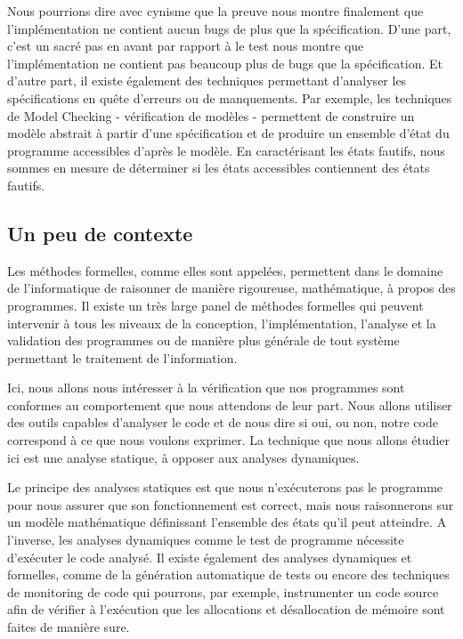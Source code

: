 \documentclass[12pt,francais,]{scrbook}
\begin{document}
Nous pourrions dire avec cynisme que la preuve nous montre finalement
que l'implémentation \og{}ne contient aucun bugs de plus que la
spécification\fg{}. D'une part, c'est un sacré pas en avant par rapport à
\og{}le test nous montre que l'implémentation ne contient pas beaucoup plus
de bugs que la spécification\fg{}. Et d'autre part, il existe également des
techniques permettant d'analyser les spécifications en quête d'erreurs
ou de manquements. Par exemple, les techniques de Model Checking -
vérification de modèles - permettent de construire un modèle abstrait à
partir d'une spécification et de produire un ensemble d'état du
programme accessibles d'après le modèle. En caractérisant les états
fautifs, nous sommes en mesure de déterminer si les états accessibles
contiennent des états fautifs.

\subsection{Un peu de contexte}\label{un-peu-de-contexte}

Les méthodes formelles, comme elles sont appelées, permettent dans le
domaine de l'informatique de raisonner de manière rigoureuse,
mathématique, à propos des programmes. Il existe un très large panel de
méthodes formelles qui peuvent intervenir à tous les niveaux de la
conception, l'implémentation, l'analyse et la validation des programmes
ou de manière plus générale de tout système permettant le traitement de
l'information.

Ici, nous allons nous intéresser à la vérification que nos programmes
sont conformes au comportement que nous attendons de leur part. Nous
allons utiliser des outils capables d'analyser le code et de nous dire
si oui, ou non, notre code correspond à ce que nous voulons exprimer. La
technique que nous allons étudier ici est une analyse statique, à
opposer aux analyses dynamiques.

Le principe des analyses statiques est que nous n'exécuterons pas le
programme pour nous assurer que son fonctionnement est correct, mais
nous raisonnerons sur un modèle mathématique définissant l'ensemble des
états qu'il peut atteindre. A l'inverse, les analyses dynamiques comme
le test de programme nécessite d'exécuter le code analysé. Il existe
également des analyses dynamiques et formelles, comme de la génération
automatique de tests ou encore des techniques de monitoring de code qui
pourrons, par exemple, instrumenter un code source afin de vérifier à
l'exécution que les allocations et désallocation de mémoire sont faites
de manière sure.
\end{document}
